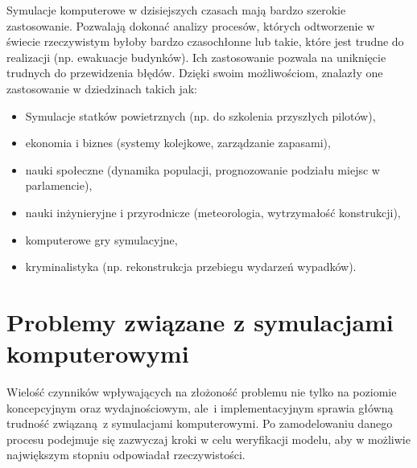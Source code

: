 Symulacje komputerowe w dzisiejszych czasach mają bardzo szerokie zastosowanie. Pozwalają dokonać analizy procesów, których odtworzenie w świecie rzeczywistym byłoby bardzo czasochłonne lub takie, które jest trudne do realizacji (np. ewakuacje budynków). Ich zastosowanie pozwala na uniknięcie trudnych do przewidzenia błędów. Dzięki swoim możliwościom, znalazły one zastosowanie w dziedzinach takich jak:

\begin{itemize}
\item Symulacje statków powietrznych (np. do szkolenia przyszłych pilotów),
\item ekonomia i biznes (systemy kolejkowe, zarządzanie zapasami),
\item nauki społeczne (dynamika populacji, prognozowanie podziału miejsc w parlamencie),
\item nauki inżynieryjne i przyrodnicze (meteorologia, wytrzymałość konstrukcji),
\item komputerowe gry symulacyjne,
\item kryminalistyka (np. rekonstrukcja przebiegu wydarzeń wypadków).
\end{itemize}

\section{Problemy związane z symulacjami komputerowymi}
\label{sec:ProblemyzSymulacjami}

Wielość czynników wpływających na złożoność problemu nie tylko na poziomie koncepcyjnym oraz wydajnościowym, ale~i implementacyjnym sprawia główną trudność związaną~z symulacjami komputerowymi. Po zamodelowaniu danego procesu podejmuje się zazwyczaj kroki w celu weryfikacji modelu, aby w możliwie największym stopniu odpowiadał rzeczywistości.
















